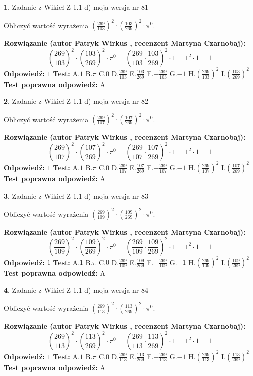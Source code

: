 \documentclass[12pt, a4paper]{article}
\theoremstyle{definition} %
\newtheorem{zad}{}
\newcommand{\zadStart}[1]{\begin{zad}#1\newline}
\newcommand{\zadStop}{\end{zad}}
\newcommand{\rozwStart}[2]{\noindent \textbf{Rozwiązanie (autor #1 , recenzent #2): }\newline}
\newcommand{\rozwStop}{\newline}
\newcommand{\odpStart}{\noindent \textbf{Odpowiedź:}\newline}
\newcommand{\odpStop}{\newline}
\newcommand{\testStart}{\noindent \textbf{Test:}\newline}
\newcommand{\testStop}{\newline}
\newcommand{\kluczStart}{\noindent \textbf{Test poprawna odpowiedź:}\newline}
\newcommand{\kluczStop}{\newline}
\begin{document}
\zadStart{Zadanie z Wikieł Z 1.1 d) moja wersja nr 81}

Obliczyć wartość wyrażenia $(\frac{269}{103})^{2} \cdot (\frac{103}{269})^{2} \cdot \pi^{0}$.
\zadStop
\rozwStart{Patryk Wirkus}{Martyna Czarnobaj}
$$(\frac{269}{103})^{2} \cdot (\frac{103}{269})^{2} \cdot \pi^{0} = (\frac{269}{103} \cdot \frac{103}{269})^{2} \cdot 1 = 1^{2} \cdot 1 = 1$$
\rozwStop
\odpStart
$1$
\odpStop
\testStart
A.$1$ B.$\pi$ C.$0$ D.$\frac{269}{103}$ E.$\frac{103}{269}$
F.$-\frac{269}{103}$ G.$-1$
H.$(\frac{269}{103})^{2}$
I.$(\frac{103}{269})^{2}$
\testStop
\kluczStart
A
\kluczStop



\zadStart{Zadanie z Wikieł Z 1.1 d) moja wersja nr 82}

Obliczyć wartość wyrażenia $(\frac{269}{107})^{2} \cdot (\frac{107}{269})^{2} \cdot \pi^{0}$.
\zadStop
\rozwStart{Patryk Wirkus}{Martyna Czarnobaj}
$$(\frac{269}{107})^{2} \cdot (\frac{107}{269})^{2} \cdot \pi^{0} = (\frac{269}{107} \cdot \frac{107}{269})^{2} \cdot 1 = 1^{2} \cdot 1 = 1$$
\rozwStop
\odpStart
$1$
\odpStop
\testStart
A.$1$ B.$\pi$ C.$0$ D.$\frac{269}{107}$ E.$\frac{107}{269}$
F.$-\frac{269}{107}$ G.$-1$
H.$(\frac{269}{107})^{2}$
I.$(\frac{107}{269})^{2}$
\testStop
\kluczStart
A
\kluczStop



\zadStart{Zadanie z Wikieł Z 1.1 d) moja wersja nr 83}

Obliczyć wartość wyrażenia $(\frac{269}{109})^{2} \cdot (\frac{109}{269})^{2} \cdot \pi^{0}$.
\zadStop
\rozwStart{Patryk Wirkus}{Martyna Czarnobaj}
$$(\frac{269}{109})^{2} \cdot (\frac{109}{269})^{2} \cdot \pi^{0} = (\frac{269}{109} \cdot \frac{109}{269})^{2} \cdot 1 = 1^{2} \cdot 1 = 1$$
\rozwStop
\odpStart
$1$
\odpStop
\testStart
A.$1$ B.$\pi$ C.$0$ D.$\frac{269}{109}$ E.$\frac{109}{269}$
F.$-\frac{269}{109}$ G.$-1$
H.$(\frac{269}{109})^{2}$
I.$(\frac{109}{269})^{2}$
\testStop
\kluczStart
A
\kluczStop



\zadStart{Zadanie z Wikieł Z 1.1 d) moja wersja nr 84}

Obliczyć wartość wyrażenia $(\frac{269}{113})^{2} \cdot (\frac{113}{269})^{2} \cdot \pi^{0}$.
\zadStop
\rozwStart{Patryk Wirkus}{Martyna Czarnobaj}
$$(\frac{269}{113})^{2} \cdot (\frac{113}{269})^{2} \cdot \pi^{0} = (\frac{269}{113} \cdot \frac{113}{269})^{2} \cdot 1 = 1^{2} \cdot 1 = 1$$
\rozwStop
\odpStart
$1$
\odpStop
\testStart
A.$1$ B.$\pi$ C.$0$ D.$\frac{269}{113}$ E.$\frac{113}{269}$
F.$-\frac{269}{113}$ G.$-1$
H.$(\frac{269}{113})^{2}$
I.$(\frac{113}{269})^{2}$
\testStop
\kluczStart
A
\kluczStop
\end{document}
